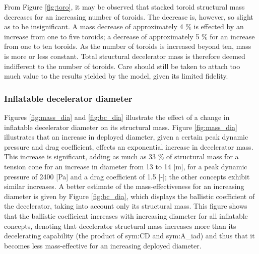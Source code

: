 From Figure \ref{fig:toro}, it may be observed that stacked toroid structural mass decreases for an increasing number of toroids. The decrease is, however, so slight as to be insignificant. A mass decrease of approximately 4 $\%$ is effected by an increase from one to five toroids; a decrease of approximately 5 $\%$ for an increase from one to ten toroids. As the number of toroids is increased beyond ten, mass is more or less constant. Total structural decelerator mass is therefore deemed indifferent to the number of toroids. Care should still be taken to attach too much value to the results yielded by the model, given its limited fidelity.

\subsubsection{Inflatable decelerator diameter}
Figures \ref{fig:mass_dia} and \ref{fig:bc_dia} illustrate the effect of a change in inflatable decelerator diameter on its structural mass. Figure \ref{fig:mass_dia} illustrates that an increase in deployed diameter, given a certain peak dynamic pressure and drag coefficient, effects an exponential increase in decelerator mass. This increase is significant, adding as much as 33 $\%$ of structural mass for a tension cone for an increase in diameter from 13 to 14 [m], for a peak dynamic pressure of 2400 [Pa] and a drag coefficient of 1.5 [-]; the other concepts exhibit similar increases. A better estimate of the mass-effectiveness for an increasing diameter is given by Figure \ref{fig:bc_dia}, which displays the ballistic coefficient of the decelerator, taking into account only its structural mass. This figure shows that the ballistic coefficient increases with increasing diameter for all inflatable concepts, denoting that decelerator structural mass increases more than its decelerating capability (the product of \gls{sym:CD} and \gls{sym:A_iad}) and thus that it becomes less mass-effective for an increasing deployed diameter.



